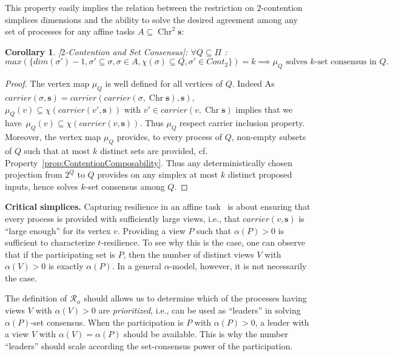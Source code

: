 \documentclass[a4paper]{article}
\newtheorem{corollary}[theorem]{Corollary}
\newcommand{\myparagraph}[1]{\vspace{6pt}\noindent \textbf{#1}}
\def\R{\ensuremath{\mathcal{R}}}
\def\s {\mathbf{s}}
\def\Chr{\operatorname{Chr}}
\def\Car{\mathit{carrier}}
\begin{document}
{This property easily implies the relation between 
the restriction on $2$-contention simplices dimensions 
and the ability to solve the desired agreement 
among any set of processes for any affine tasks $A\subseteq\Chr^2\s$:

\begin{corollary}{[$2$-Contention and Set Consensus]:} $\forall Q\subseteq\Pi$ :\\
\[max(\{{\mathit{dim}}(\sigma')-1,\sigma'\subseteq\sigma, \sigma\in A, \chi(\sigma)\subseteq Q, \sigma'\in{\mathit{Cont}_2}\})=k \implies \mu_Q \textrm{\ solves\ } k\textrm{-set\ consensus\ in\ } Q{}.\]
\end{corollary}

\begin{proof}
The vertex map $\mu_Q$ is well defined for all vertices of $Q$.
Indeed As $\Car(\sigma,\s)=\Car(\Car(\sigma,\Chr\s),\s)$, 
$\mu_Q(v)\subseteq \chi(\Car(v',\s))$ with $v'\in \Car(v,\Chr\s)$ 
implies that we have~$\mu_Q(v)\subseteq \chi(\Car(v,\s))$. Thus 
$\mu_Q$ respect carrier inclusion property.
Moreover, the vertex map $\mu_Q$ provides, to every process of $Q$, 
non-empty subsets of $Q$ such that at most $k$ distinct sets are provided, cf. Property~\ref{prop:ContentionComposability}.
Thus any deterministically chosen projection from $2^Q$ to $Q$
provides on any simplex at most $k$ distinct proposed inputs,
hence solves $k$-set consensus among $Q$.
\end{proof}
}


\myparagraph{Critical simplices.}
%
Capturing resilience in an affine task~\cite{SHG16} is about ensuring
that every process is provided with sufficiently large 
views, i.e., that $\Car(v,\s)$ is ``large enough'' for its vertex $v$.
%
Providing a view $P$ such that 
$\alpha(P)>0$ is sufficient to characterize $t$-resilience.
%
To see why this is the case, one can observe that if the participating
set is $P$, then the number of distinct views $V$ with $\alpha(V)>0$
is exactly $\alpha(P)$.
%
In a general $\alpha$-model, however, it is not necessarily the case.
%
%


The definition of $\R_{\alpha}$ should allows us to determine which
of the processes having views $V$ with $\alpha(V)>0$ 
are \emph{prioritized}, i.e., can be used as ``leaders'' in solving
$\alpha(P)$-set consensus.
%
When the participation is $P$ with $\alpha(P)>0$, a leader 
with a view $V$ with $\alpha(V)=\alpha(P)$ should be available.
This is why the number ``leaders'' should scale
according the set-consensus power of the participation.
\end{document}
